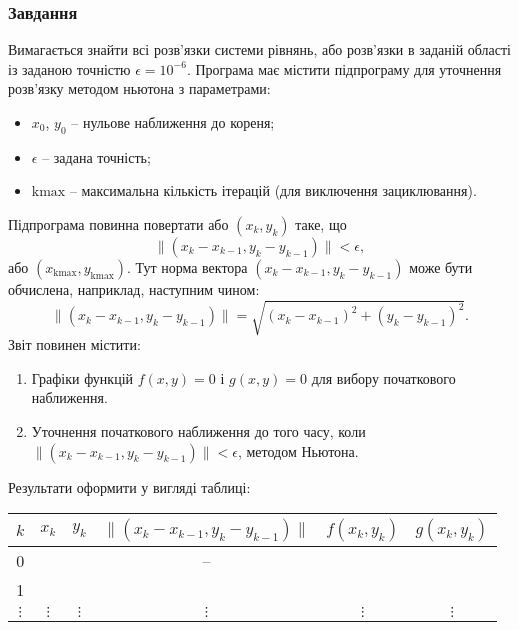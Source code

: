 \subsubsection{Завдання}

Вимагається знайти всі розв'язки системи рівнянь, або розв'язки в заданій області із заданою точністю $\epsilon = 10^{-6}$. Програма має містити підпрограму для уточнення розв'язку методом ньютона з параметрами:
\begin{itemize}
	\item $x_0$, $y_0$ -- нульове наближення до кореня;
	\item $\epsilon$ -- задана точність;
	\item $\text{kmax}$ -- максимальна кількість ітерацій (для виключення зациклювання).
\end{itemize}

Підпрограма повинна повертати або $(x_k, y_k)$ таке, що 
\[ \| (x_k - x_{k - 1}, y_k - y_{k-1})\| < \epsilon,\] 
або $(x_{\text{kmax}}, y_{\text{kmax}})$. Тут норма вектора $(x_k - x_{k - 1}, y_k - y_{k-1})$ може бути обчислена, наприклад, наступним чином: 
\[ \| (x_k - x_{k - 1}, y_k - y_{k-1})\| = \sqrt{(x_k - x_{k - 1})^2 + (y_k - y_{k-1})^2 }.\]
Звіт повинен містити:
\begin{enumerate}
	\item Графіки функцій $f(x,y)=0$ і $g(x,y)=0$ для вибору початкового наближення.
	\item Уточнення початкового наближення до того часу, коли $\| (x_k - x_{k - 1}, y_k - y_{k-1})\| < \epsilon$, методом Ньютона.
\end{enumerate}
Результати оформити у вигляді таблиці:
\begin{table}[H]
	\centering
	\begin{tabular}{|c|c|c|c|c|c|}
		\hline
		$k$ & $x_k$ & $y_k$ & $\| (x_k - x_{k - 1}, y_k - y_{k-1})\|$ & $f(x_k, y_k)$ & $g(x_k, y_k)$ \\ \hline
		0 & & & -- & & \\ \hline
		1 & & & & & \\ \hline
		$\vdots$ & $\vdots$ & $\vdots$ & $\vdots$ & $\vdots$ & $\vdots$ \\ \hline
	\end{tabular}
\end{table}